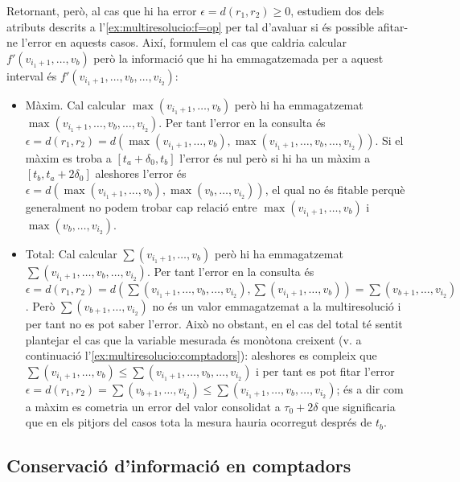 Retornant, però, al cas que hi ha error $\epsilon=d(r_1,r_2)\geq 0$,
estudiem dos dels atributs descrits a
l'\autoref{ex:multiresolucio:f=op} per tal d'avaluar si és possible
afitar-ne l'error en aquests casos. Així, formulem el cas que caldria
calcular $f'(v_{i_1+1},\dotsc,v_{b})$ però la informació que hi ha
emmagatzemada per a aquest interval és
$f'(v_{i_1+1},\dotsc,v_{b},\dotsc,v_{i_2})$:
\begin{itemize}

\item Màxim. Cal calcular $\max(v_{i_1+1},\dotsc,v_{b})$ però hi ha
  emmagatzemat $\max(v_{i_1+1},\dotsc,v_{b},\dotsc,v_{i_2})$.  Per
  tant l'error en la consulta és $\epsilon=d(r_1,r_2)=
  d(\max(v_{i_1+1},\dotsc,v_{b}),\max(v_{i_1+1},\dotsc,v_{b},\dotsc,v_{i_2}))$. Si
  el màxim es troba a $[t_a+\delta_0,t_b]$ l'error és nul però si hi
  ha un màxim a $[t_b,t_a+2\delta_0]$ aleshores l'error és
  $\epsilon=d(\max(v_{i_1+1},\dotsc,v_{b}),\max(v_{b},\dotsc,v_{i_2}))$,
  el qual no és fitable perquè generalment no podem trobar cap relació
  entre $\max(v_{i_1+1},\dotsc,v_{b})$ i $\max(v_{b},\dotsc,v_{i_2})$.


\item Total: Cal calcular $\sum(v_{i_1+1},\dotsc,v_{b})$ però hi ha
  emmagatzemat $\sum(v_{i_1+1},\dotsc,v_{b},\dotsc,v_{i_2})$. Per tant
  l'error en la consulta és $\epsilon=d(r_1,r_2)=d(
  \sum(v_{i_1+1},\dotsc,v_{b},\dotsc,v_{i_2}),\sum(v_{i_1+1},\dotsc,v_{b}))
  = \sum(v_{b+1},\dotsc,v_{i_2})$. Però $\sum(v_{b+1},\dotsc,v_{i_2})$
  no és un valor emmagatzemat a la multiresolució i per tant no es pot
  saber l'error. Això no obstant, en el cas del total té sentit
  plantejar el cas que la variable mesurada és monòtona creixent (v. a
  continuació l'\autoref{ex:multiresolucio:comptadors}): aleshores es
  compleix que $\sum(v_{i_1+1},\dotsc,v_{b}) \leq
  \sum(v_{i_1+1},\dotsc,v_{b},\dotsc,v_{i_2})$ i per tant es pot fitar
  l'error $\epsilon=d(r_1,r_2) = \sum(v_{b+1},\dotsc,v_{i_2}) \leq
  \sum(v_{i_1+1},\dotsc,v_{b},\dotsc,v_{i_2})$; és a dir com a màxim
  es cometria un error del valor consolidat a $\tau_0+2\delta$ que
  significaria que en els pitjors del casos tota la mesura hauria
  ocorregut després de $t_b$.


\end{itemize}






\subsection{Conservació d'informació en comptadors}
  \label{ex:multiresolucio:comptadors}



